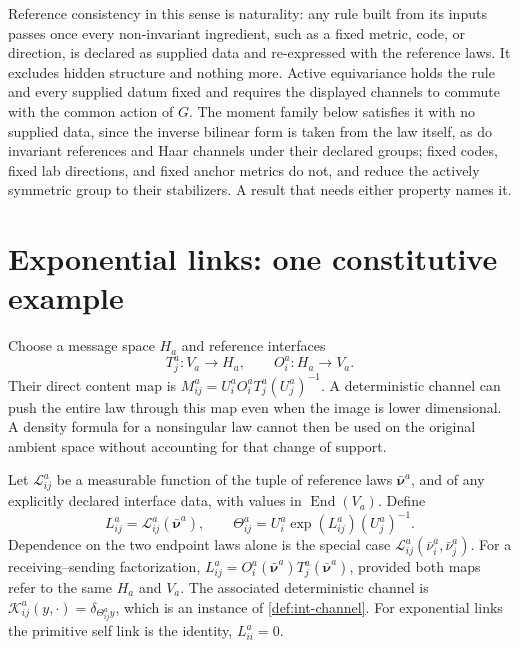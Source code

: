 Reference consistency in this sense is naturality: any rule built from its inputs passes once every non-invariant ingredient, such as a fixed metric, code, or direction, is declared as supplied data and re-expressed with the reference laws. It excludes hidden structure and nothing more. Active equivariance holds the rule and every supplied datum fixed and requires the displayed channels to commute with the common action of $G$. The moment family below satisfies it with no supplied data, since the inverse bilinear form is taken from the law itself, as do invariant references and Haar channels under their declared groups; fixed codes, fixed lab directions, and fixed anchor metrics do not, and reduce the actively symmetric group to their stabilizers. A result that needs either property names it.

\section{Exponential links: one constitutive example}

Choose a message space $H_a$ and reference interfaces
\begin{equation}
T_j^a:V_a\longrightarrow H_a,\qquad
O_i^a:H_a\longrightarrow V_a.
\end{equation}
Their direct content map is $M_{ij}^a=U_i^aO_i^aT_j^a(U_j^a)^{-1}$. A deterministic channel can push the entire law through this map even when the image is lower dimensional. A density formula for a nonsingular law cannot then be used on the original ambient space without accounting for that change of support.

Let $\mathcal L_{ij}^a$ be a measurable function of the tuple of reference laws $\bar{\boldsymbol\nu}^a$, and of any explicitly declared interface data, with values in $\operatorname{End}(V_a)$. Define
\begin{equation}
L_{ij}^a=\mathcal L_{ij}^a(\bar{\boldsymbol\nu}^a),\qquad
\Theta_{ij}^a=U_i^a\exp(L_{ij}^a)(U_j^a)^{-1}.
\label{eq:int-exponential-link}
\end{equation}
Dependence on the two endpoint laws alone is the special case $\mathcal L_{ij}^a(\bar\nu_i^a,\bar\nu_j^a)$. For a receiving--sending factorization, $L_{ij}^a=O_i^a(\bar{\boldsymbol\nu}^a)T_j^a(\bar{\boldsymbol\nu}^a)$, provided both maps refer to the same $H_a$ and $V_a$. The associated deterministic channel is $\mathcal K_{ij}^a(y,\cdot)=\delta_{\Theta_{ij}^ay}$, which is an instance of \cref{def:int-channel}. For exponential links the primitive self link is the identity, $L_{ii}^a=0$.

